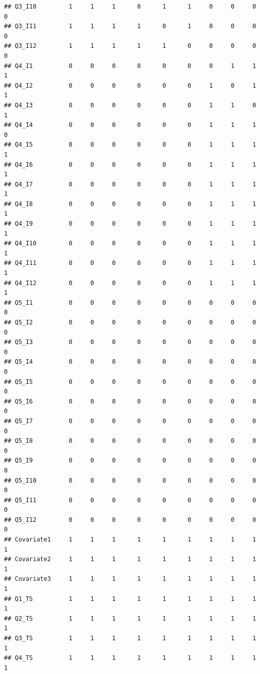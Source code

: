 \documentclass[]{book}
\begin{document}
\begin{verbatim}
## Q3_I10         1     1     1      0      1      1     0     0     0     0
## Q3_I11         1     1     1      1      0      1     0     0     0     0
## Q3_I12         1     1     1      1      1      0     0     0     0     0
## Q4_I1          0     0     0      0      0      0     0     1     1     1
## Q4_I2          0     0     0      0      0      0     1     0     1     1
## Q4_I3          0     0     0      0      0      0     1     1     0     1
## Q4_I4          0     0     0      0      0      0     1     1     1     0
## Q4_I5          0     0     0      0      0      0     1     1     1     1
## Q4_I6          0     0     0      0      0      0     1     1     1     1
## Q4_I7          0     0     0      0      0      0     1     1     1     1
## Q4_I8          0     0     0      0      0      0     1     1     1     1
## Q4_I9          0     0     0      0      0      0     1     1     1     1
## Q4_I10         0     0     0      0      0      0     1     1     1     1
## Q4_I11         0     0     0      0      0      0     1     1     1     1
## Q4_I12         0     0     0      0      0      0     1     1     1     1
## Q5_I1          0     0     0      0      0      0     0     0     0     0
## Q5_I2          0     0     0      0      0      0     0     0     0     0
## Q5_I3          0     0     0      0      0      0     0     0     0     0
## Q5_I4          0     0     0      0      0      0     0     0     0     0
## Q5_I5          0     0     0      0      0      0     0     0     0     0
## Q5_I6          0     0     0      0      0      0     0     0     0     0
## Q5_I7          0     0     0      0      0      0     0     0     0     0
## Q5_I8          0     0     0      0      0      0     0     0     0     0
## Q5_I9          0     0     0      0      0      0     0     0     0     0
## Q5_I10         0     0     0      0      0      0     0     0     0     0
## Q5_I11         0     0     0      0      0      0     0     0     0     0
## Q5_I12         0     0     0      0      0      0     0     0     0     0
## Covariate1     1     1     1      1      1      1     1     1     1     1
## Covariate2     1     1     1      1      1      1     1     1     1     1
## Covariate3     1     1     1      1      1      1     1     1     1     1
## Q1_TS          1     1     1      1      1      1     1     1     1     1
## Q2_TS          1     1     1      1      1      1     1     1     1     1
## Q3_TS          1     1     1      1      1      1     1     1     1     1
## Q4_TS          1     1     1      1      1      1     1     1     1     1

\end{verbatim}
\end{document}
